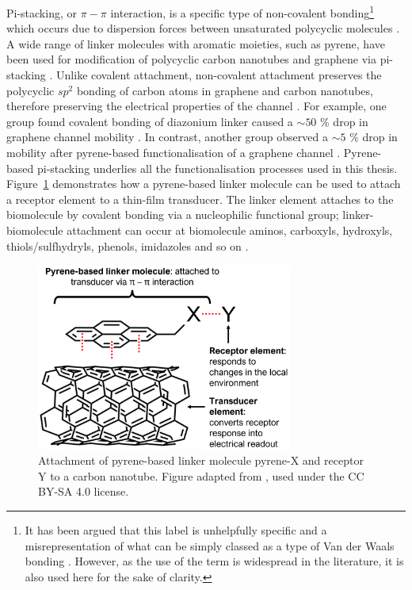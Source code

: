 \documentclass[
  a4paper,
]{scrbook}
\begin{document}
Pi-stacking, or \(\pi-\pi\) interaction, is a specific type of
non-covalent bonding\footnote{It has been argued that this label is
  unhelpfully specific and a misrepresentation of what can be simply
  classed as a type of Van der Waals bonding
  \autocite{Martinez2012,Perez2015}. However, as the use of the term is
  widespread in the literature, it is also used here for the sake of
  clarity.} which occurs due to dispersion forces between unsaturated
polycyclic molecules \autocite{Perez2015}. A wide range of linker
molecules with aromatic moieties, such as pyrene, have been used for
modification of polycyclic carbon nanotubes and graphene via pi-stacking
\autocite{Hermanson2013-16,Perez2015,Zhou2019,Mishyn2022}. Unlike
covalent attachment, non-covalent attachment preserves the polycyclic
\(sp^2\) bonding of carbon atoms in graphene and carbon nanotubes,
therefore preserving the electrical properties of the channel
\autocite{DiCrescenzo2014,Yao2021,Shkodra2021,Li2023}. For example, one
group found covalent bonding of diazonium linker caused a \(\sim 50\) \%
drop in graphene channel mobility \autocite{Lerner2014}. In contrast,
another group observed a \(\sim 5\) \% drop in mobility after
pyrene-based functionalisation of a graphene channel
\autocite{Thodkar2021}. Pyrene-based pi-stacking underlies all the
functionalisation processes used in this thesis.
Figure~\ref{fig-pi-interaction-cnt} demonstrates how a pyrene-based
linker molecule can be used to attach a receptor element to a thin-film
transducer. The linker element attaches to the biomolecule by covalent
bonding via a nucleophilic functional group; linker-biomolecule
attachment can occur at biomolecule aminos, carboxyls, hydroxyls,
thiols/sulfhydryls, phenols, imidazoles and so on
\autocite{Fruh2011,Dung2018}.

\begin{figure}

{\centering \includegraphics[width=0.75\textwidth,height=\textheight]{figures/ch6/pyrene-cnt.png}

}

\caption[Attachment of pyrene-based linker molecule pyrene-X and
receptor Y to a carbon nanotube, representing the transducer element of
a field-effect transistor.]{\label{fig-pi-interaction-cnt}Attachment of
pyrene-based linker molecule pyrene-X and receptor Y to a carbon
nanotube. Figure adapted from \autocite{Carbonnanotube}, used under the
CC BY-SA 4.0 license.}

\end{figure}
\end{document}
